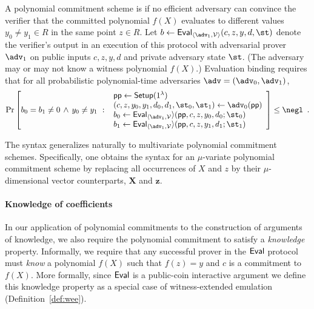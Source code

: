 \begin{definition}
A polynomial commitment scheme is  if no efficient adversary can convince the verifier that the committed polynomial $f(X)$ evaluates to different values $y_0 \neq y_1 \in R$ in the same point $z \in R$. Let $b \gets \pro{Eval}_{\langle \adv_1, \verifier\rangle}(c, z, y, d, \st)$ denote the verifier's output in an execution of this protocol with adversarial prover $\adv_1$ on public inputs $c, z, y, d$ and private adversary state $\st$. (The adversary may or may not know a witness polynomial $f(X)$.) Evaluation binding requires that for all probabilistic polynomial-time adversaries $\adv = (\adv_0, \adv_1)$,
\[
    \Pr\left[
         b_0 = b_1 \neq 0 \, \wedge \, y_0 \neq y_1 \ 
         : \
       \begin{array}{l}
            \params \gets \pro{Setup}(1^\lambda) \\
            (c, z, y_0, y_1, d_0, d_1, \st_0, \st_1) \gets \adv_0(\params) \\
            b_0 \gets \pro{Eval}_{\langle \adv_1, \verifier} \rangle(\params, c, z, y_0, d_0; \st_0) \\
            b_1 \gets \pro{Eval}_{\langle \adv_1, \verifier} \rangle(\params, c, z, y_1, d_1; \st_1) \\
        \end{array}
    \right] \leq \negl \enspace .
\]
\end{definition}

The syntax generalizes naturally to multivariate polynomial commitment schemes. Specifically, one obtains the syntax for an $\mu$-variate polynomial commitment scheme by replacing all occurrences of $X$ and $z$ by their $\mu$-dimensional vector counterparts, $\mathbf{X}$ and $\mathbf{z}$.

\paragraph{Knowledge of coefficients} In our application of polynomial commitments to the construction of arguments of knowledge, we also require the polynomial commitment to satisfy a \emph{knowledge} property. Informally, we require that any successful prover in the $\textsf{{Eval}}$ protocol must \emph{know} a polynomial $f(X)$ such that $f(z) = y$ and $c$ is a commitment to $f(X)$. More formally, since $\textsf{{Eval}}$ is a public-coin interactive argument we define this knowledge property as a special case of witness-extended emulation (Definition~\ref{def:wee}). 

